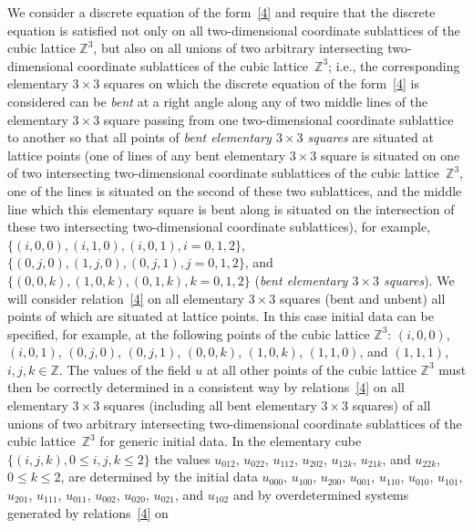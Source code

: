 \documentclass[11pt]{article}
\begin{document}
We consider a discrete equation of the form~\eqref{4} and require
that the discrete equation is sa\-tis\-f\/ied not only on all
two-dimensional coordinate sublattices of the cubic lattice
$\mathbb{Z}^3$, but also on all unions of two arbitrary intersecting
two-dimensional coordinate sublattices of the cubic lattice~$\mathbb{Z}^3$; i.e., the corresponding elementary $3 \times 3$
squares on which the discrete equation of the form~\eqref{4} is
considered can be {\it bent} at a right angle along any of two
middle lines of the elementary $3 \times 3$ square passing from one
two-dimensional coordinate sublattice to another so that all points
of {\it bent elementary $3 \times 3$ squares} are situated at
lattice points (one of lines of any bent elementary $3 \times 3$
square is situated on one of two intersecting two-dimensional
coordinate sublattices of the cubic lattice~$\mathbb{Z}^3$, one of
the lines is situated on the second of these two sublattices, and
the middle line which this elementary square is bent along is
situated on the intersection of these two intersecting
two-dimensional coordinate sublattices), for example, $\{(i, 0, 0),
(i, 1, 0), (i, 0, 1), i = 0, 1, 2\}$, $\{(0, j, 0), (1, j, 0), (0,
j, 1), j = 0, 1, 2\}$, and $\{(0, 0, k), (1, 0, k), (0, 1, k), k =
0, 1, 2\}$ ({\it bent elementary $3 \times 3$ squares}). We will
consider relation~\eqref{4} on all elementary $3 \times 3$ squares
(bent and unbent) all points of which are situated at lattice
points. In this case initial data can be specif\/ied, for example, at
the following points of the cubic lattice $\mathbb{Z}^3$: $(i, 0,
0)$, $(i, 0, 1)$, $(0, j, 0)$, $(0, j, 1)$, $(0, 0, k)$, $(1, 0,
k)$, $(1, 1, 0)$, and $(1, 1, 1)$, $i, j, k \in \mathbb{Z}$. The
values of the f\/ield $u$ at all other points of the cubic lattice
$\mathbb{Z}^3$ must then be correctly determined in a consistent way
by relations~\eqref{4} on all elementary $3 \times 3$ squares
(including all bent elementary $3 \times 3$ squares) of all unions
of two arbitrary intersecting two-dimensional coordinate sublattices
of the cubic lattice~$\mathbb{Z}^3$ for generic initial data. In the
elementary cube $\{(i, j, k), 0 \leq i, j, k \leq 2 \}$ the values
$u_{0 1 2}$, $u_{0 2 2}$, $u_{1 1 2}$, $u_{2 0 2}$, $u_{1 2 k}$,
$u_{2 1 k}$, and $u_{2 2 k}$, $0 \leq k \leq 2$, are determined by
the initial data $u_{0 0 0}$, $u_{1 0 0}$, $u_{2 0 0}$, $u_{0 0 1}$,
$u_{1 1 0}$, $u_{0 1 0}$, $u_{1 0 1}$, $u_{2 0 1}$, $u_{1 1 1}$,
$u_{0 1 1}$, $u_{0 0 2}$, $u_{0 2 0}$, $u_{0 2 1}$, and $u_{1 0 2}$
and by overdetermined systems generated by relations~\eqref{4} on
\end{document}
